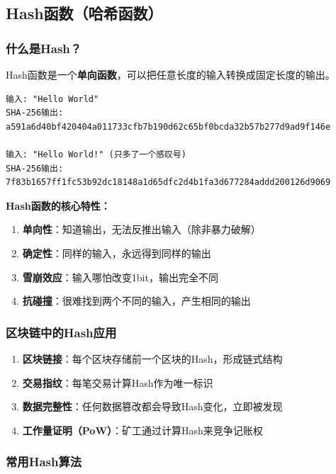 ﻿\documentclass[12pt,a4paper]{article}
\begin{document}
\subsection{Hash函数（哈希函数）}

\subsubsection{什么是Hash？}

Hash函数是一个\textbf{单向函数}，可以把任意长度的输入转换成固定长度的输出。

\begin{lstlisting}
输入: "Hello World"
SHA-256输出: a591a6d40bf420404a011733cfb7b190d62c65bf0bcda32b57b277d9ad9f146e

输入: "Hello World!" (只多了一个感叹号)
SHA-256输出: 7f83b1657ff1fc53b92dc18148a1d65dfc2d4b1fa3d677284addd200126d9069
\end{lstlisting}

\begin{theorybox}
\textbf{Hash函数的核心特性：}
\begin{enumerate}
\item \textbf{单向性}：知道输出，无法反推出输入（除非暴力破解）
\item \textbf{确定性}：同样的输入，永远得到同样的输出
\item \textbf{雪崩效应}：输入哪怕改变1bit，输出完全不同
\item \textbf{抗碰撞}：很难找到两个不同的输入，产生相同的输出
\end{enumerate}
\end{theorybox}

\subsubsection{区块链中的Hash应用}

\begin{enumerate}[leftmargin=1.5em]
\item \textbf{区块链接}：每个区块存储前一个区块的Hash，形成链式结构
\item \textbf{交易指纹}：每笔交易计算Hash作为唯一标识
\item \textbf{数据完整性}：任何数据篡改都会导致Hash变化，立即被发现
\item \textbf{工作量证明（PoW）}：矿工通过计算Hash来竞争记账权
\end{enumerate}

\subsubsection{常用Hash算法}
\end{document}
